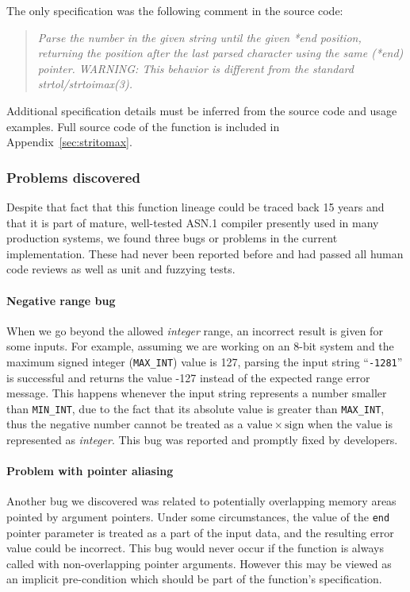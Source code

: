 \documentclass[10p,conference]{IEEEtran}
\begin{document}
The only specification was the following comment in the source code:

\begin{quote}
 { \it Parse the number in the given string until the given *end position,
 returning the position after the last parsed character using the
 same (*end) pointer.
 WARNING: This behavior is different from the standard strtol/strtoimax(3). }
\end{quote}

Additional specification details must be inferred from the source code
and usage examples. Full source code of the function is included in
Appendix~\ref{sec:stritomax}.

\subsubsection{Problems discovered}

Despite that fact that this function lineage could be traced back 15
years and that it is part of mature, well-tested ASN.1 compiler presently used
in many production systems, we
found three bugs or problems in the current implementation. These had
never been reported before and had passed all human code reviews as
well as unit and fuzzying tests.
  
\paragraph{Negative range bug}

When we go beyond the allowed \textit{integer} range, an incorrect result is given
for some inputs. For example, assuming we are working on an 8-bit
system and the maximum signed integer (\texttt{MAX\_INT}) value is 127, parsing the input
string ``\texttt{-1281}'' is successful and returns the value -127 instead of the expected range error message. This happens whenever the input
string represents a number smaller than \texttt{MIN\_INT}, due to the
fact that its absolute value is greater than
\texttt{MAX\_INT}, thus the negative number cannot be treated as a
$\mathrm{value}\times\mathrm{sign}$ when the $\mathrm{value}$ is
represented as \textit{integer}. This bug was reported and promptly fixed by
developers.

\paragraph{Problem with pointer aliasing}

Another bug we discovered was related to potentially overlapping
memory areas pointed by argument pointers. Under some circumstances,
the value of the \texttt{end} pointer parameter is treated as a part
of the input data, and the resulting error value could be
incorrect. This bug would never occur if the function is always called
with non-overlapping pointer arguments. However this may be viewed
as an implicit pre-condition which should be part of the function's
specification.
\end{document}
